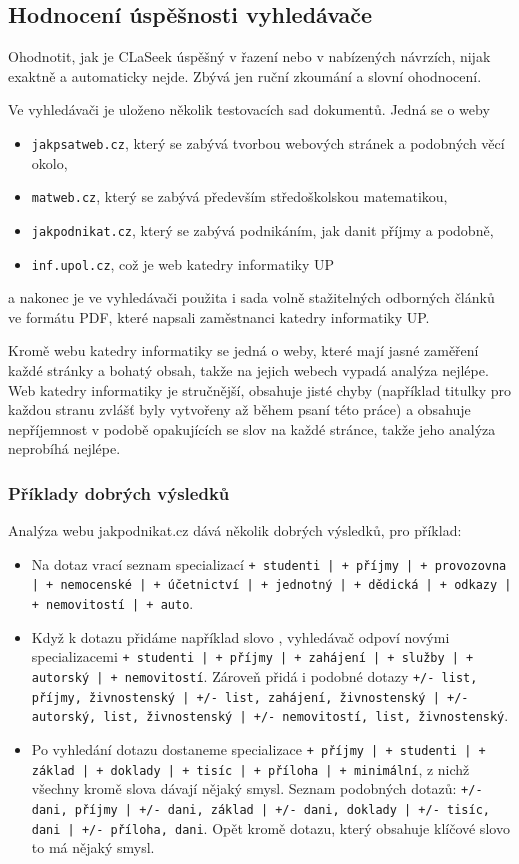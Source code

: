 \documentclass{article}
\newcommand{\name}{CLaSeek}
\newcommand{\code}[1]{\texttt{#1}}
\newcommand{\ssection}[1]{\subsection{#1}}
\newcommand{\sssection}[1]{\subsubsection{#1}}
\begin{document}
\ssection{Hodnocení úspěšnosti vyhledávače}
Ohodnotit, jak je \name{} úspěšný v řazení nebo v nabízených návrzích, nijak exaktně a automaticky nejde. Zbývá jen ruční zkoumání a slovní ohodnocení. 

Ve vyhledávači je uloženo několik testovacích sad dokumentů. Jedná se o weby 
\begin{itemize}
	\item \code{jakpsatweb.cz}, který se zabývá tvorbou webových stránek a podobných věcí okolo, 
	\item \code{matweb.cz}, který se zabývá především středoškolskou matematikou,
	\item \code{jakpodnikat.cz}, který se zabývá podnikáním, jak danit příjmy a podobně,
	\item \code{inf.upol.cz}, což je web katedry informatiky UP
\end{itemize}
a nakonec je ve vyhledávači použita i sada volně stažitelných odborných článků ve formátu PDF, které napsali zaměstnanci katedry informatiky UP. 

Kromě webu katedry informatiky se jedná o weby, které mají jasné zaměření každé stránky a bohatý obsah, takže na jejich webech vypadá analýza nejlépe. Web katedry informatiky je stručnější, obsahuje jisté chyby (například titulky pro každou stranu zvlášť byly vytvořeny až během psaní této práce) a obsahuje nepříjemnost v podobě opakujících se slov na každé stránce, takže jeho analýza neprobíhá nejlépe. 

\sssection{Příklady dobrých výsledků}
Analýza webu jakpodnikat.cz dává několik dobrých výsledků, pro příklad:

\begin{itemize}
	\item Na dotaz  vrací seznam specializací \code{+ studenti | + příjmy | + provozovna | + nemocenské | + účetnictví | + jednotný | + dědická | + odkazy | + nemovitostí | + auto}.
	\item Když k dotazu přidáme například slovo , vyhledávač odpoví novými specializacemi \code{+ studenti | + příjmy | + zahájení | + služby | + autorský | + nemovitostí}. Zároveň přidá i podobné dotazy \code{+/- list, příjmy, živnostenský | +/- list, zahájení, živnostenský | +/- autorský, list, živnostenský | +/- nemovitostí, list, živnostenský}.
	\item Po vyhledání dotazu  dostaneme specializace \code{+ příjmy | + studenti | + základ | + doklady | + tisíc | + příloha | + minimální}, z nichž všechny kromě slova  dávají nějaký smysl. Seznam podobných dotazů: \code{+/- dani, příjmy | +/- dani, základ | +/- dani, doklady | +/- tisíc, dani | +/- příloha, dani}. Opět kromě dotazu, který obsahuje klíčové slovo  to má nějaký smysl. 
\end{itemize}
\end{document}
